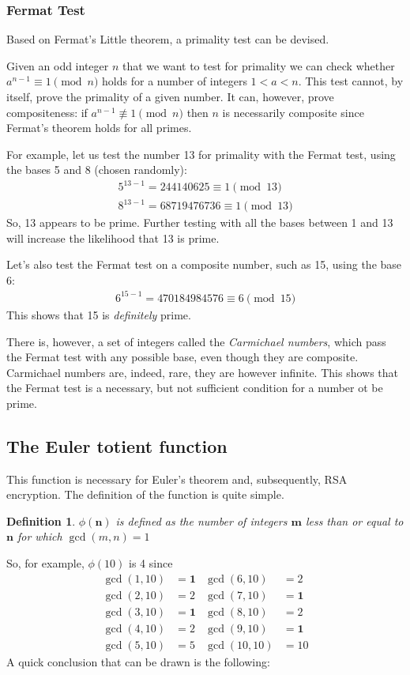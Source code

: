 \documentclass[12pt, titlepage]{article}
\newtheorem*{definition}{Definition}
\begin{document}
\subsubsection{Fermat Test}

Based on Fermat's Little theorem, a primality test can be devised.

Given an odd integer $n$ that we want to test for primality we can check whether $a^{n-1}
\equiv 1 \pmod{n}$ holds for a number of integers $1<a<n$.  This test cannot, by itself,
prove the primality of a given number. It can, however, prove compositeness: if $a^{n-1}
\not\equiv 1 \pmod{n}$ then $n$ is necessarily composite since Fermat's theorem holds for
all primes. \autocite{primality_akalin} 

For example, let us test the number 13 for primality with the Fermat test, using the bases 5
and 8 (chosen randomly):
%
\begin{align*}
    5^{13-1} = 244140625   \equiv 1 \pmod{13}\\
    8^{13-1} = 68719476736 \equiv 1 \pmod{13}
\end{align*}
%
So, 13 appears to be prime. Further testing with all the bases between 1 and 13 will
increase the likelihood that 13 is prime.

Let's also test the Fermat test on a composite number, such as 15, using the base 6:
%
\begin{align*}
    6^{15-1} = 470184984576 \equiv 6 \pmod{15}
\end{align*}
%
This shows that 15 is \emph{definitely} prime.

There is, however, a set of integers called the \emph{Carmichael numbers}, which pass the
Fermat test with any possible base, even though they are composite. Carmichael numbers are,
indeed, rare, they are however infinite. \autocite[116]{dence} This shows that the Fermat
test is a necessary, but not sufficient condition for a number ot be prime.

\subsection{The Euler totient function}

This function is necessary for Euler's theorem and, subsequently, RSA encryption. The
definition of the function is quite simple.
%
\begin{definition}
    $\phi(\mathbf{n})$ is defined as the \emph{number} of integers $\mathbf{m}$ less than or
    equal to $\mathbf{n}$ for which $\gcd(m, n) = 1$
\end{definition}
%
So, for example, $\phi(10)$ is 4 since 
%
\begin{align*}
    \gcd(1, 10) &= \mathbf{1} &\gcd(6, 10) &= 2\\
    \gcd(2, 10) &= 2          &\gcd(7, 10) &= \mathbf{1}\\
    \gcd(3, 10) &= \mathbf{1} &\gcd(8, 10) &= 2\\
    \gcd(4, 10) &= 2          &\gcd(9, 10) &= \mathbf{1}\\
    \gcd(5, 10) &= 5          &\gcd(10, 10) &= 10
\end{align*}
%
A quick conclusion that can be drawn is the following:
\end{document}
